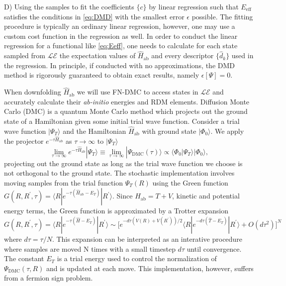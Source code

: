 \documentclass{article}
\begin{document}
D) Using the samples to fit the coefficients $\{c\}$ by linear regression such that $E_\text{eff}$ satisfies the conditions in \eqref{eq:DMD} with the smallest error $\epsilon$ possible. 
The fitting procedure is typically an ordinary linear regression, however, one may use a custom cost function in the regression as well. 
In order to conduct the linear regression for a functional like \eqref{eq:Eeff}, one needs to calculate for each state sampled from $\mathcal{LE}$ the expectation values of $\hat{H}_\text{ab}$ and every descriptor $\{\hat{d}_k\}$ used in the regression.
In principle, if conducted with no approximations, the DMD method is rigorously guaranteed to obtain exact results, namely $\epsilon[\Psi] = 0$.

When downfolding $\hat{H}_\text{ab}$ we will use FN-DMC to access states in $\mathcal{LE}$ and accurately calculate their \textit{ab-initio} energies and RDM elements.
Diffusion Monte Carlo (DMC) is a quantum Monte Carlo method which projects out the ground state of a Hamiltonian given some initial trial wave function.
Consider a trial wave function $|\Psi_T\rangle$ and the Hamiltonian $\hat{H}_\text{ab}$ with ground state $|\Phi_0\rangle$. We apply the projector $e^{-\tau \hat{H}_\text{ab}}$ as $\tau \rightarrow \infty$ to $|\Psi_T \rangle$
\begin{equation}
\lim_{\tau \rightarrow \infty} e^{-\tau \hat{H}_\text{ab}} |\Psi_T\rangle 
\equiv \lim_{\tau \rightarrow \infty} |\Psi_\text{DMC}(\tau)\rangle \propto \langle \Phi_0|\Psi_T\rangle |\Phi_0\rangle,
\end{equation}
projecting out the ground state as long as the trial wave function we choose is not orthogonal to the ground state. 
The stochastic implementation involves moving samples from the trial function $\Psi_T(R)$ using the Green function $G(R, R^\prime, \tau) = \langle R | e^{-\tau(\hat{H}_\text{ab} - E_T)} | R^\prime \rangle$. Since $H_\text{ab} = T + V$, kinetic and potential energy terms, the Green function is approximated by a Trotter expansion $G(R, R^\prime, \tau) = \langle R | e^{-\tau(\hat{H} - E_T)} | R^\prime \rangle \sim \Big[e^{-d\tau(V(R) + V(R^\prime))/2} \langle R| e^{-d\tau(\hat{T} - E_T)}|R^\prime \rangle + O(d\tau^2) \Big]^N $ where $d\tau = \tau/N$.
This expansion can be interpreted as an interative procedure where samples are moved N times with a small timestep $d\tau$ until convergence.
The constant $E_T$ is a trial energy used to control the normalization of $\Psi_\text{DMC}(\tau, R)$ and is updated at each move.
This implementation, however, suffers from a fermion sign problem. 
\end{document}
